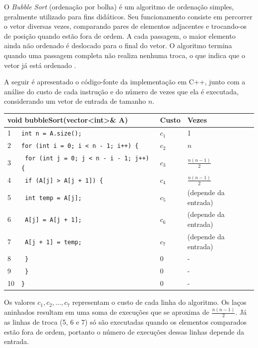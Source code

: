 
\qquad O \textit{Bubble Sort} (ordenação por bolha) é um algoritmo de ordenação simples, geralmente utilizado para fins didáticos. Seu funcionamento consiste em percorrer o vetor diversas vezes, comparando pares de elementos adjacentes e trocando-os de posição quando estão fora de ordem. A cada passagem, o maior elemento ainda não ordenado é deslocado para o final do vetor. O algoritmo termina quando uma passagem completa não realiza nenhuma troca, o que indica que o vetor já está ordenado \cite{cormen}.


\qquad A seguir é apresentado o código-fonte da implementação em C++, junto com a análise do custo de cada instrução e do número de vezes que ela é executada, considerando um vetor de entrada de tamanho $n$.

\vspace{1cm} %

\begin{center}
\begin{tabular}{l l l l}
\hline
\multicolumn{2}{l}{\textbf{void bubbleSort(vector<int>\& A)}} & \textbf{Custo} & \textbf{Vezes} \\
\hline
1 & \texttt{int n = A.size();} & $c_1$ & 1 \\
2 & \texttt{for (int i = 0; i < n - 1; i++) \{} & $c_2$ & $n$ \\
3 & \texttt{    for (int j = 0; j < n - i - 1; j++) \{} & $c_3$ & $\frac{n(n-1)}{2}$ \\
4 & \texttt{        if (A[j] > A[j + 1]) \{} & $c_4$ & $\frac{n(n-1)}{2}$ \\
5 & \texttt{            int temp = A[j];} & $c_5$ & (depende da entrada) \\
6 & \texttt{            A[j] = A[j + 1];} & $c_6$ & (depende da entrada) \\
7 & \texttt{            A[j + 1] = temp;} & $c_7$ & (depende da entrada) \\
8 & \texttt{        \}} & 0 & - \\
9 & \texttt{    \}} & 0 & - \\
10 & \texttt{\}} & 0 & - \\
\hline
\end{tabular}
\end{center}

\vspace{1cm} %

\qquad Os valores $c_1, c_2, \dots, c_7$ representam o custo de cada linha do algoritmo. Os laços aninhados resultam em uma soma de execuções que se aproxima de $\frac{n(n-1)}{2}$. Já as linhas de troca (5, 6 e 7) só são executadas quando os elementos comparados estão fora de ordem, portanto o número de execuções dessas linhas depende da entrada.